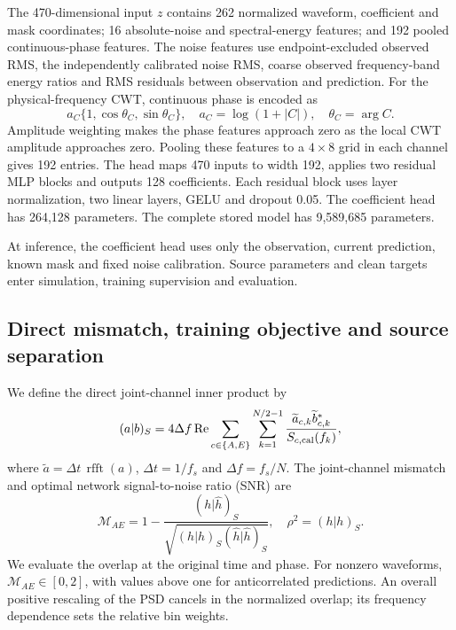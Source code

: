 \documentclass[10pt,prd,aps,a4paper,twocolumn,superscriptaddress,nofootinbib,floatfix]{revtex4-2}
\begin{document}
The 470-dimensional input $z$ contains 262 normalized waveform, coefficient and mask coordinates; 16 absolute-noise and spectral-energy features; and 192 pooled continuous-phase features. The noise features use endpoint-excluded observed RMS, the independently calibrated noise RMS, coarse observed frequency-band energy ratios and RMS residuals between observation and prediction. For the physical-frequency CWT, continuous phase is encoded as
\begin{equation}
a_C\{1,\cos\theta_C,\sin\theta_C\},\quad
a_C=\log(1+|C|),\quad\theta_C=\arg C.\label{eq:continuous_phase}
\end{equation}
Amplitude weighting makes the phase features approach zero as the local CWT amplitude approaches zero. Pooling these features to a $4\times8$ grid in each channel gives 192 entries. The head maps 470 inputs to width 192, applies two residual MLP blocks and outputs 128 coefficients. Each residual block uses layer normalization, two linear layers, GELU and dropout 0.05. The coefficient head has 264,128 parameters. The complete stored model has 9,589,685 parameters.

At inference, the coefficient head uses only the observation, current prediction, known mask and fixed noise calibration. Source parameters and clean targets enter simulation, training supervision and evaluation.

\subsection{Direct mismatch, training objective and source separation}\label{loss}
We define the direct joint-channel inner product by
\begin{equation}
(a|b)_S=4\Delta f\operatorname{Re}
\sum_{c\in\{A,E\}}\sum_{k=1}^{N/2-1}
\frac{\widetilde a_{c,k}\widetilde b_{c,k}^{*}}{S_{c,\rm cal}(f_k)},\label{eq:joint_inner}
\end{equation}
where $\widetilde a=\Delta t\,\operatorname{rfft}(a)$, $\Delta t=1/f_s$ and $\Delta f=f_s/N$. The joint-channel mismatch and optimal network signal-to-noise ratio (SNR) are
\begin{equation}
\mathcal M_{AE}=1-\frac{(h|\widehat h)_S}{\sqrt{(h|h)_S(\widehat h|\widehat h)_S}},\quad
\rho^2=(h|h)_S.\label{eq:joint_mismatch}
\end{equation}
We evaluate the overlap at the original time and phase. For nonzero waveforms, $\mathcal M_{AE}\in[0,2]$, with values above one for anticorrelated predictions. An overall positive rescaling of the PSD cancels in the normalized overlap; its frequency dependence sets the relative bin weights.
\end{document}
